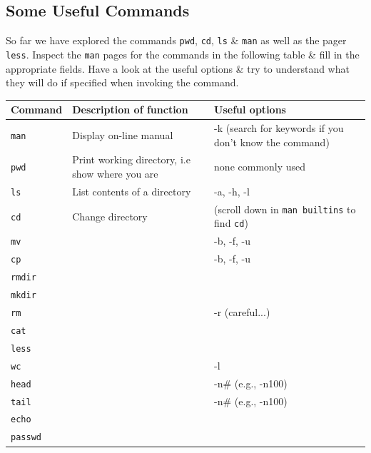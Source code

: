 \documentclass[a4paper,12pt,twoside]{memoir}
\begin{document}
\subsection{Some Useful Commands}
\begin{steps}
So far we have explored the commands \texttt{pwd}, \texttt{cd}, \texttt{ls} \& \texttt{man} as well as the pager \texttt{less}.
Inspect the \texttt{man} pages for the commands in the following table  \& fill in the appropriate fields.
Have a look at the useful options \& try to understand what they will do if specified when invoking the command. \\

\begin{center}
\renewcommand{\arraystretch}{1.6}
\begin{tabular}{|p{2cm} | p{8.5cm} | p{4.5cm}|}
\hline
\textbf{Command} & \textbf{Description of function} & \textbf{Useful options} \\ \hline
\texttt{man} & Display on-line manual & -k (search for keywords if you don't know the command) \\ \hline
\texttt{pwd} & Print working directory, i.e show where you are & none commonly used \\ \hline
\texttt{ls} & List contents of a directory & -a, -h, -l \\ \hline
\texttt{cd} & Change directory & (scroll down in \texttt{man builtins} to find \texttt{cd}) \\ \hline
\texttt{mv} & & -b, -f, -u \\ \hline
\texttt{cp} & & -b, -f, -u \\ \hline
\texttt{rmdir} & & \\ \hline
\texttt{mkdir} & & \\ \hline
\texttt{rm} & & -r (careful...) \\ \hline
\texttt{cat} & & \\ \hline
\texttt{less} & & \\ \hline
\texttt{wc} & & -l \\ \hline
\texttt{head} & & -n\# (e.g., -n100) \\ \hline
\texttt{tail} & & -n\# (e.g., -n100) \\ \hline
\texttt{echo} & & \\ \hline
\texttt{passwd} & & \\ \hline
\end{tabular}
\end{center}
\end{steps}
\end{document}
